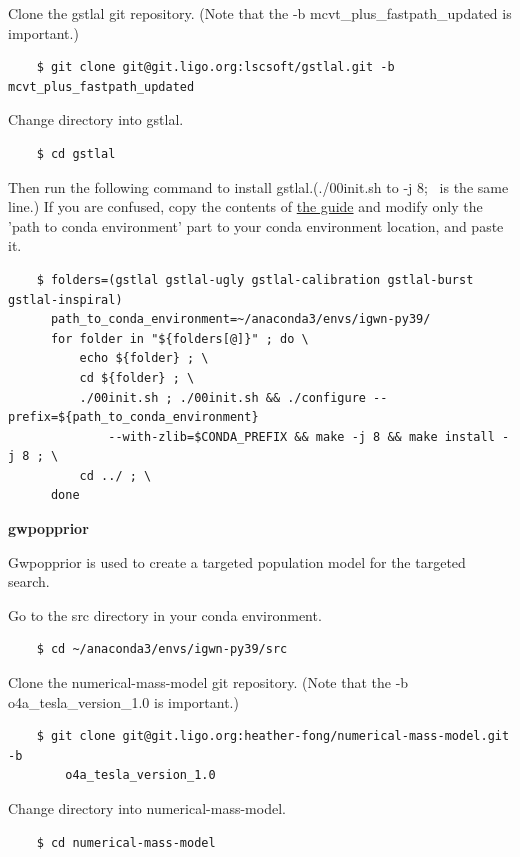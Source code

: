 Clone the gstlal git repository. (Note that the -b mcvt\_plus\_fastpath\_updated is important.)

\begin{verbatim}
    $ git clone git@git.ligo.org:lscsoft/gstlal.git -b mcvt_plus_fastpath_updated
\end{verbatim}

Change directory into gstlal.

\begin{verbatim}
    $ cd gstlal
\end{verbatim}

Then run the following command to install gstlal.(./00init.sh to -j 8; \ is the same line.) If you are confused, copy the contents of \href{https://git.ligo.org/alvin.li/tesla/-/tree/o4a_version_1.0}{the guide} and modify only the 'path to conda environment' part to your conda environment location, and paste it.

\begin{verbatim}
    $ folders=(gstlal gstlal-ugly gstlal-calibration gstlal-burst gstlal-inspiral)
      path_to_conda_environment=~/anaconda3/envs/igwn-py39/
      for folder in "${folders[@]}" ; do \
	      echo ${folder} ; \
	      cd ${folder} ; \
	      ./00init.sh ; ./00init.sh && ./configure --prefix=${path_to_conda_environment}
              --with-zlib=$CONDA_PREFIX && make -j 8 && make install -j 8 ; \
	      cd ../ ; \
      done
\end{verbatim}

\textbf{gwpopprior}

Gwpopprior is used to create a targeted population model for the targeted search.

Go to the src directory in your conda environment.

\begin{verbatim}
    $ cd ~/anaconda3/envs/igwn-py39/src
\end{verbatim}

Clone the numerical-mass-model git repository. (Note that the -b o4a\_tesla\_version\_1.0 is important.)

\begin{verbatim}
    $ git clone git@git.ligo.org:heather-fong/numerical-mass-model.git -b
        o4a_tesla_version_1.0
\end{verbatim}

Change directory into numerical-mass-model.

\begin{verbatim}
    $ cd numerical-mass-model
\end{verbatim}

